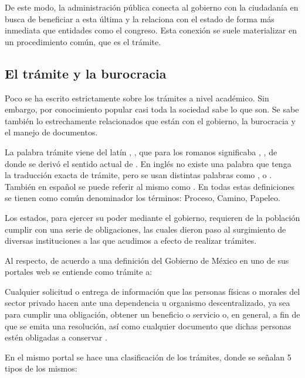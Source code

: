 De este modo, la administración pública conecta al gobierno con la ciudadanía en
busca de beneficiar a esta última y la relaciona con el estado de forma más inmediata que entidades como el congreso.
Esta conexión se suele materializar en un procedimiento común, que es el
trámite.

\subsection{El trámite y la burocracia}

Poco se ha escrito estrictamente sobre los trámites a nivel académico. Sin
embargo, por conocimiento popular casi toda la sociedad sabe lo que son. Se sabe
también lo estrechamente relacionados que están con el gobierno, la burocracia y
el manejo de documentos.

La palabra trámite viene del latín ,
, que para los romanos significaba ,
, de donde se derivó el sentido actual de . En inglés no existe una palabra que
tenga la traducción exacta de trámite, pero se usan distintas palabras como
,  o .
También en español se puede referir al mismo como . En todas estas definiciones se tienen como común denominador
los términos: Proceso, Camino, Papeleo.

Los estados, para ejercer su poder mediante el gobierno, requieren de la
población cumplir con una serie de obligaciones, las cuales dieron paso al
surgimiento de diversas instituciones a las que acudimos a efecto de realizar
trámites.

Al respecto, de acuerdo a una definición del Gobierno de México en uno de sus
portales web se entiende como trámite a:

\begin{displayquote}
    Cualquier solicitud o entrega de información que las
    personas físicas o morales del sector privado hacen ante una dependencia u
    organismo descentralizado, ya sea para cumplir una obligación, obtener un
    beneficio o servicio o, en general, a fin de que se emita una resolución, así
    como cualquier documento que dichas personas estén obligadas a conservar
    \cite{epnQueEsTramite}.
\end{displayquote}

En el mismo portal se hace una clasificación de los trámites, donde se señalan 5
tipos de los mismos:

